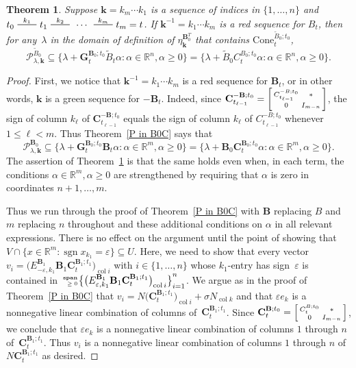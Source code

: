 \documentclass{amsart}
\newtheorem{theorem}[proposition]{Theorem}
\theoremstyle{definition}
\theoremstyle{remark}
\numberwithin{equation}{section}
\newcommand{\reals}{\mathbb R}
\newcommand{\edge}{\,\,\rule[2.7pt]{20pt}{0.5pt}\,\,}
\newcommand{\ep}{\varepsilon}
\newcommand{\col}{\operatorname{col}}
\newcommand{\sgn}{\operatorname{sgn}}
\newcommand{\nnspan}{{\!\!\tiny\begin{array}{r}\mathbf{span}\\\ge0\end{array}\hspace*{-0.57em}}}
\newcommand{\set}[1]{{\lbrace #1 \rbrace}}
\newcommand{\sett}[1]{{\bigl\lbrace #1 \bigr\rbrace}}
\newcommand{\GG}{{\mathbf G}}
\newcommand{\CC}{{\mathbf C}}
\newcommand{\0}{{\mathbf{0}}}
\newcommand{\Cone}{\mathrm{Cone}}
\newcommand{\kk}{{\boldsymbol{k}}}
\newcommand{\tB}{{\tilde{B}}}
\newcommand{\BB}{\mathbf{B}}
\renewcommand{\P}{\mathcal{P}}
\begin{document}
\begin{theorem}\label{P in B0C extended}
Suppose $\kk=k_m\cdots k_1$ is a sequence of indices in $\set{1,\ldots, n}$ and $t_0\overset{k_1}{\edge}t_1\overset{k_2}{\edge}\,\cdots\,\overset{k_m}{\edge}t_m=t$.
If $\kk^{-1}=k_1\cdots k_m$ is a red sequence for $B_t$, then for any~$\lambda$ in the domain of definition of $\eta_\kk^{\BB_0^T}$ that contains $\Cone^{\tB_0;t_0}_t$,
\[\P^{\tB_0}_{\lambda,\kk}\subseteq\set{\lambda+\GG_t^{\BB_0;t_0}\tB_t\alpha:\alpha\in\reals^n,\alpha\ge0}=\set{\lambda+\tB_0C_t^{B_0;t_0}\alpha:\alpha\in\reals^n,\alpha\ge0}.\]
\end{theorem}
\begin{proof}
First, we notice that $\kk^{-1}=k_1\cdots k_m$ is a red sequence for $\BB_t$, or in other words, $\kk$ is a green sequence for $-\BB_t$.
Indeed, since $\CC_{t_{\ell-1}}^{-\BB;t_0}=\begin{bsmallmatrix}C_{t_{\ell-1}}^{-B;t_0}&*\\0&I_{m-n}\end{bsmallmatrix}$, the sign of column $k_\ell$ of $\CC_{t_{\ell-1}}^{-\BB;t_0}$ equals the sign of column $k_\ell$ of $C_{t_{\ell-1}}^{-B;t_0}$ whenever $1\le\ell<m$.
Thus Theorem~\ref{P in B0C} says that
\[\P^{\BB_0}_{\lambda,\kk}\subseteq\set{\lambda+\GG_t^{\BB_0;t_0}\BB_t\alpha:\alpha\in\reals^m,\alpha\ge0}=\set{\lambda+\BB_0\CC_t^{\BB_0;t_0}\alpha:\alpha\in\reals^m,\alpha\ge0}.\]
The assertion of Theorem~\ref{P in B0C extended} is that the same holds even when, in each term, the conditions $\alpha\in\reals^m,\alpha\ge0$ are strengthened by requiring that $\alpha$ is zero in coordinates $n+1,\ldots,m$.

Thus we run through the proof of Theorem~\ref{P in B0C} with $\BB$ replacing $B$ and $m$ replacing $n$ throughout and these additional conditions on $\alpha$ in all relevant expressions.
There is no effect on the argument until the point of showing that $V\cap\set{x\in\reals^m:\sgn x_{k_1}=\ep}\subseteq U$.
Here, we need to show that every vector $v_i=\bigl(E^{\BB_1}_{-\ep,k_1}\BB_1\CC_t^{\BB_1;t_1}\bigr)_{\col i}$ with $i\in\set{1,\ldots,n}$ whose $k_1$-entry has sign~$\ep$ is contained in $\nnspan\sett{\bigl(E^{\BB_1}_{\ep,k_1}\BB_1\CC_t^{\BB_1;t_1}\bigr)_{\col i}}_{i=1}^n$.
We argue as in the proof of Theorem~\ref{P in B0C} that $v_i=N\bigl(\CC_t^{\BB_1;t_1}\bigr)_{\col i}+\sigma N_{\col k}$ and that $\ep e_k$ is a nonnegative linear combination of columns of~$\CC_t^{\BB_1;t_1}$.
Since $\CC_t^{\BB;t_0}=\begin{bsmallmatrix}C_t^{B;t_0}&*\\0&I_{m-n}\end{bsmallmatrix}$, we conclude that $\ep e_k$ is a nonnegative linear combination of columns $1$ through $n$ of~$\CC_t^{\BB_1;t_1}$.
Thus $v_i$ is a nonnegative linear combination of columns $1$ through $n$ of~$N\CC_t^{\BB_1;t_1}$ as desired.
\end{proof}
\end{document}
